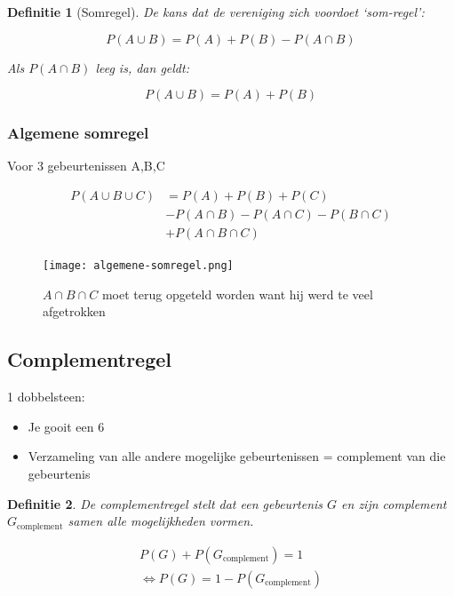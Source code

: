 \documentclass{article}
\newtheorem{theorem}{Definitie}[section]
\begin{document}
\begin{theorem}[Somregel]
De kans dat de vereniging zich voordoet `som-regel':

\begin{equation}
    P(A \cup B) = P(A) + P(B) - P(A \cap B)
\end{equation}

Als $P(A \cap B)$ leeg is, dan geldt:

\begin{equation}
    P(A \cup B) = P(A) + P(B)
\end{equation}
\end{theorem}

\subsubsection{Algemene somregel}

Voor 3 gebeurtenissen A,B,C

\begin{equation}
    \begin{aligned}
        P(A \cup B \cup C) &= P(A) + P(B) + P(C)\\
        & - P(A \cap B) - P(A \cap C) - P(B \cap C)\\
        & + P(A \cap B \cap C)
    \end{aligned}
\end{equation}



\begin{figure}[H]
    \centering
    \texttt{[image: algemene-somregel.png]}
    \caption{$A \cap B \cap C$ moet terug opgeteld worden want hij werd te veel afgetrokken}
\end{figure}

\subsection{Complementregel}

1 dobbelsteen:

\begin{itemize}
    \item Je gooit een 6
    \item Verzameling van alle andere mogelijke gebeurtenissen = complement van die gebeurtenis
\end{itemize}

\begin{theorem}
    De complementregel stelt dat een gebeurtenis $G$ en zijn complement $G_{\text{complement}}$ samen alle mogelijkheden vormen.

    \begin{equation}
        \begin{aligned}
            P(G) + P(G_{\text{complement}}) = 1\\
            \Leftrightarrow P(G) = 1 - P(G_{\text{complement}})
        \end{aligned}
    \end{equation}
\end{theorem}
\end{document}
